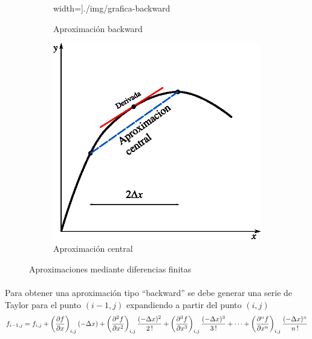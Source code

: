 \documentclass[letterpaper, openright, 12pt]{book}
\begin{document}
\begin{figure}[htbp!]
\begin{subfigure}[c]{0.45\textwidth}
                width=\textwidth]{./img/grafica-backward}
            \caption{Aproximación backward}
            \label{fig:grafica_backward}
        \end{subfigure}
        \begin{subfigure}[c]{0.45\textwidth}
            \includegraphics[keepaspectratio,
                width=\textwidth]{./img/grafica-central}
            \caption{Aproximación central}
            \label{fig:grafica_central}
        \end{subfigure}
        \caption{Aproximaciones mediante diferencias finitas}
        \label{fig:grafica_aproximaciones}
    \end{figure}

\paragraph*{}
    Para obtener una aproximación tipo ``backward'' se debe generar una serie
    de Taylor para el punto $(i-1, j)$ expandiendo a partir del punto $(i, j)$
    \begin{equation}
    f_{i-1, j} = f_{i,j} + \left(\pdv{f}{x}\right)_{i,j} (-\Delta x)
    + \left(\pdv[2]{f}{x} \right)_{i,j} \frac{(-\Delta x)^2 }{2\,!}
    + \left( \pdv[3]{f}{x} \right)_{i,j} \frac{(-\Delta x)^3}{3\,!}
    + \dotsb + \left(\pdv[n]{f}{x} \right)_{i,j} \frac{(-\Delta x)^n}{n\,!}
    \label{taylor-backward}
    \end{equation}
\end{document}
